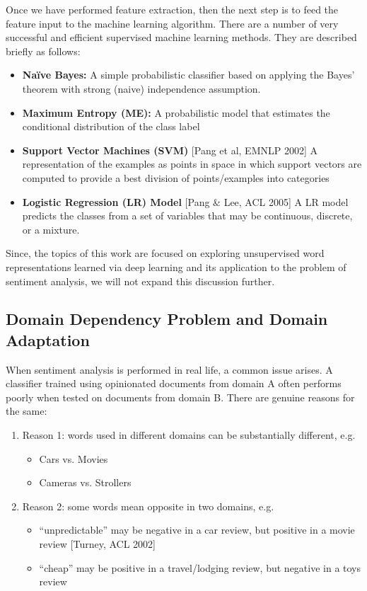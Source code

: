 Once we have performed feature extraction, then the next step is to feed the feature input to the machine learning algorithm. There are a number of very successful and efficient supervised machine learning methods. They are described briefly as follows:
\begin{itemize}
\item \textbf{Na\"{i}ve Bayes:} A simple probabilistic classifier based on applying the Bayes' theorem with strong (naive) independence assumption.
\item \textbf{Maximum Entropy (ME):}  A probabilistic model that estimates the conditional distribution of the class label
\item \textbf{Support Vector Machines (SVM)} [Pang et al, EMNLP 2002] A representation of the examples as points in space in which support vectors are computed to provide a best division of points/examples into categories
\item \textbf{Logistic Regression (LR) Model} [Pang \& Lee, ACL 2005] A LR model predicts the classes from a set of variables that may be continuous, discrete, or a mixture.
\end{itemize}

Since, the topics of this work are focused on exploring unsupervised word representations learned via deep learning and its application to the problem of sentiment analysis, we will not expand this discussion further.

\subsection{Domain Dependency Problem and Domain Adaptation}
When sentiment analysis is performed in real life, a common issue arises. A classifier trained using opinionated documents from domain A often performs poorly when tested on documents from domain B. There are genuine reasons for the same:
\begin{enumerate}
\item Reason 1: words used in different domains can be substantially different, e.g.
\begin{itemize}
\item Cars vs. Movies
\item Cameras vs. Strollers
\end{itemize}
\item Reason 2: some words mean opposite in two domains, e.g.
\begin{itemize}
\item “unpredictable” may be negative in a car review, but positive in a movie review [Turney, ACL 2002]
\item “cheap” may be positive in a travel/lodging review, but negative in a toys review
\end{itemize}
\end{enumerate}

